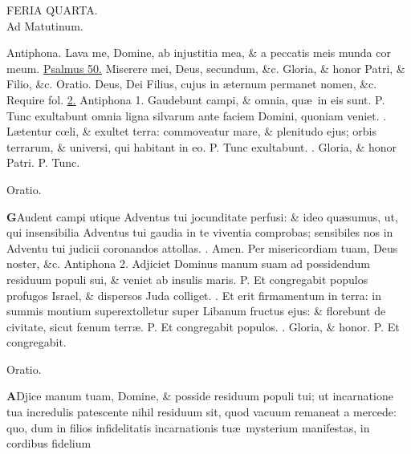 \documentclass[letter,11pt]{book}
\makeatletter
\DeclareRobustCommand{\Vbar}{\vers@resp{-0.1em}{V}}
\DeclareRobustCommand{\Rbar}{\vers@resp{0pt}{R}}
\newcommand{\vers@resp@sym}{\raisebox{0.2ex}{\rotatebox[origin=c]{-20}{$\m@th\rceil$}}}
\newcommand{\vers@resp}[2]{%
  {\ooalign{\hidewidth\kern#1\vers@resp@sym\hidewidth\cr#2\cr}}%
}%
\def\P{\color{Red} P. \color{black}}
\def\V{\color{Red} \Vbar . \color{black}}
\def\R{\color{Red} \Rbar . \color{black}}
\makeatother
\begin{document}
\begin{multicols}{2}
\begin{center}
FERIA QUARTA.\\
\color{Red} Ad Matutinum.
\end{center} \vspace{-.5em}
\par \noindent \color{Red} Antiphona. \color{black} Lava me, Domine, ab injustitia mea, \& a peccatis meis munda cor meum. \color{Red} \hyperlink{ps50}{Psalmus 50.} \color{black} Miserere mei, Deus, secundum, \&c. Gloria, \& honor Patri, \& Filio, \&c.
\newline \color{Red} Oratio. \color{black} Deus, Dei Filius, cujus in \ae ternum permanet nomen, \&c. \color{Red} Require fol. \color{black} \hyperlink{page.2}{2.}
\newline \color{Red} Antiphona 1. \color{black} Gaudebunt campi, \& omnia, qu\ae \ in eis sunt. \P Tunc exultabunt omnia ligna silvarum ante faciem Domini, quoniam veniet. \V L\ae tentur c\oe li, \& exultet terra: commoveatur mare, \& plenitudo ejus; orbis terrarum, \& universi, qui habitant in eo. \P Tunc exultabunt. \V Gloria, \& honor Patri. \P Tunc.
\vspace{-.5em} \begin{center} \color{Red} Oratio. \color{black} \end{center} \vspace{-.5em}
\lettrine[lines=2]{\bfseries \color{Red} G}{}Audent campi utique Adventus tui jocunditate perfusi: \& ideo qu\ae sumus, ut, qui insensibilia Adventus tui gaudia in te viventia comprobas; sensibiles nos in Adventu tui judicii coronandos attollas. \R Amen. Per misericordiam tuam, Deus noster, \&c.
\newline \color{Red} Antiphona 2. \color{black} Adjiciet Dominus manum suam ad possidendum residuum populi sui, \& veniet ab insulis maris. \P Et congregabit populos profugos Israel, \& dispersos Juda colliget. \V Et erit firmamentum in terra: in summis montium superextolletur super Libanum fructus ejus: \& florebunt de civitate, sicut f\oe num terr\ae . \P Et congregabit populos. \V Gloria, \& honor. \P Et congregabit.
\vspace{-.5em} \begin{center} \color{Red} Oratio. \color{black} \end{center} \vspace{-.5em}
\lettrine[lines=2]{\bfseries \color{Red} A}{}Djice manum tuam, Domine, \& posside residuum populi tui; ut incarnatione tua incredulis patescente nihil residuum sit, quod vacuum remaneat a mercede: quo, dum in filios infidelitatis incarnationis tu\ae \ mysterium manifestas, in cordibus fidelium

\end{multicols}
\end{document}

